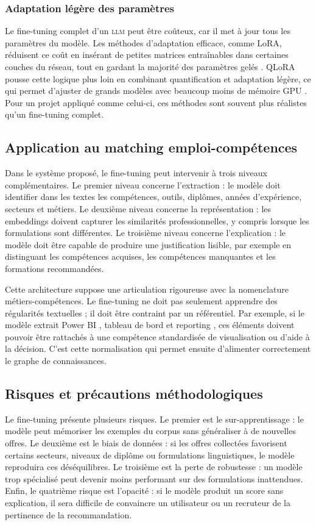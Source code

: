 \documentclass[12pt,twoside]{report}
\newcommand{\LLM}{\textsc{llm}}
\begin{document}
\subsubsection{Adaptation légère des paramètres}
Le fine-tuning complet d'un \LLM{} peut être coûteux, car il met à jour tous les paramètres du modèle. Les méthodes d'adaptation efficace, comme LoRA, réduisent ce coût en insérant de petites matrices entraînables dans certaines couches du réseau, tout en gardant la majorité des paramètres gelés \cite{hu2021lora}. QLoRA pousse cette logique plus loin en combinant quantification et adaptation légère, ce qui permet d'ajuster de grands modèles avec beaucoup moins de mémoire GPU \cite{dettmers2023qlora}. Pour un projet appliqué comme celui-ci, ces méthodes sont souvent plus réalistes qu'un fine-tuning complet.

\subsection{Application au matching emploi-compétences}
Dans le système proposé, le fine-tuning peut intervenir à trois niveaux complémentaires. Le premier niveau concerne l'extraction : le modèle doit identifier dans les textes les compétences, outils, diplômes, années d'expérience, secteurs et métiers. Le deuxième niveau concerne la représentation : les embeddings doivent capturer les similarités professionnelles, y compris lorsque les formulations sont différentes. Le troisième niveau concerne l'explication : le modèle doit être capable de produire une justification lisible, par exemple en distinguant les compétences acquises, les compétences manquantes et les formations recommandées.

Cette architecture suppose une articulation rigoureuse avec la nomenclature métiers-compétences. Le fine-tuning ne doit pas seulement apprendre des régularités textuelles ; il doit être contraint par un référentiel. Par exemple, si le modèle extrait \og Power BI \fg{}, \og tableau de bord \fg{} et \og reporting \fg{}, ces éléments doivent pouvoir être rattachés à une compétence standardisée de visualisation ou d'aide à la décision. C'est cette normalisation qui permet ensuite d'alimenter correctement le graphe de connaissances.

\subsection{Risques et précautions méthodologiques}
Le fine-tuning présente plusieurs risques. Le premier est le sur-apprentissage : le modèle peut mémoriser les exemples du corpus sans généraliser à de nouvelles offres. Le deuxième est le biais de données : si les offres collectées favorisent certains secteurs, niveaux de diplôme ou formulations linguistiques, le modèle reproduira ces déséquilibres. Le troisième est la perte de robustesse : un modèle trop spécialisé peut devenir moins performant sur des formulations inattendues. Enfin, le quatrième risque est l'opacité : si le modèle produit un score sans explication, il sera difficile de convaincre un utilisateur ou un recruteur de la pertinence de la recommandation.
\end{document}
